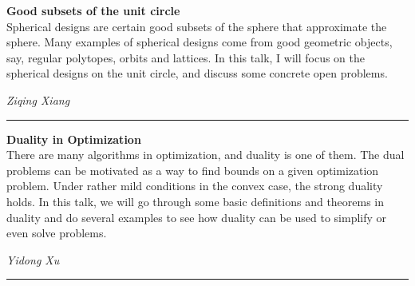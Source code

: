 \documentclass[oneside]{amsart}
\begin{document}
\filbreak
\hspace{-20pt}\textbf{ \textbf{ Good subsets of the unit circle } } \vspace{0.5em}\\
Spherical designs are certain good subsets of the sphere that approximate the sphere. Many examples of spherical designs come from good geometric objects, say, regular polytopes, orbits and lattices. In this talk, I will focus on the spherical designs on the unit circle, and discuss some concrete open problems. \vspace{-1em}\\
\begin{flushright} \textit{ Ziqing Xiang } \vspace{0.5em} \end{flushright}
\rule{\textwidth}{0.4pt}
\vspace{0.5em}

\filbreak
\hspace{-20pt}\textbf{ \textbf{ Duality in Optimization } } \vspace{0.5em}\\
There are many algorithms in optimization, and duality is one of them. The dual problems can be motivated as a way to find bounds on a given optimization problem. Under rather mild conditions in the convex case, the strong duality holds. In this talk, we will go through some basic definitions and theorems in duality and do several examples to see how duality can be used to simplify or even solve problems. \vspace{-1em}\\
\begin{flushright} \textit{ Yidong Xu } \vspace{0.5em} \end{flushright}
\rule{\textwidth}{0.4pt}
\vspace{0.5em}
\end{document}
